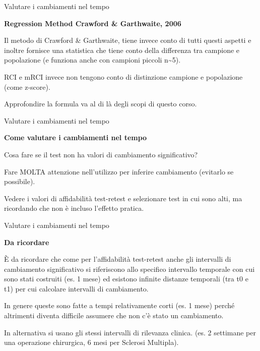 \documentclass[
  ignorenonframetext,
]{beamer}
\begin{document}
\begin{frame}{Valutare i cambiamenti nel tempo}
\label{valutare-i-cambiamenti-nel-tempo-14}
\begin{center}
\textbf{Regression Method Crawford \& Garthwaite, 2006}
\end{center}
\vspace{2em}

Il metodo di Crawford \& Garthwaite, tiene invece conto di tutti questi
aspetti e inoltre fornisce una statistica che tiene conto della
differenza tra campione e popolazione (e funziona anche con campioni
piccoli n\textasciitilde5).

RCI e mRCI invece non tengono conto di distinzione campione e
popolazione (come z-score).

Approfondire la formula va al di là degli scopi di questo corso.
\end{frame}

\begin{frame}{Valutare i cambiamenti nel tempo}
\label{valutare-i-cambiamenti-nel-tempo-15}
\begin{center}
\textbf{Come valutare i cambiamenti nel tempo}
\end{center}
\vspace{2em}

Cosa fare se il test non ha valori di cambiamento significativo?

Fare MOLTA attenzione nell'utilizzo per inferire cambiamento (evitarlo
se possibile).

Vedere i valori di affidabilità test-retest e selezionare test in cui
sono alti, ma ricordando che non è incluso l'effetto pratica.
\end{frame}

\begin{frame}{Valutare i cambiamenti nel tempo}
\label{valutare-i-cambiamenti-nel-tempo-16}
\begin{center}
\textbf{Da ricordare}
\end{center}
\vspace{1em}

È da ricordare che come per l'affidabilità test-retest anche gli
intervalli di cambiamento significativo si riferiscono allo specifico
intervallo temporale con cui sono stati costruiti (es. 1 mese) ed
esistono infinite distanze temporali (tra t0 e t1) per cui calcolare
intervalli di cambiamento.

In genere queste sono fatte a tempi relativamente corti (es. 1 mese)
perché altrimenti diventa difficile assumere che non c'è stato un
cambiamento.

In alternativa si usano gli stessi intervalli di rilevanza clinica. (es.
2 settimane per una operazione chirurgica, 6 mesi per Sclerosi
Multipla).
\end{frame}
\end{document}
